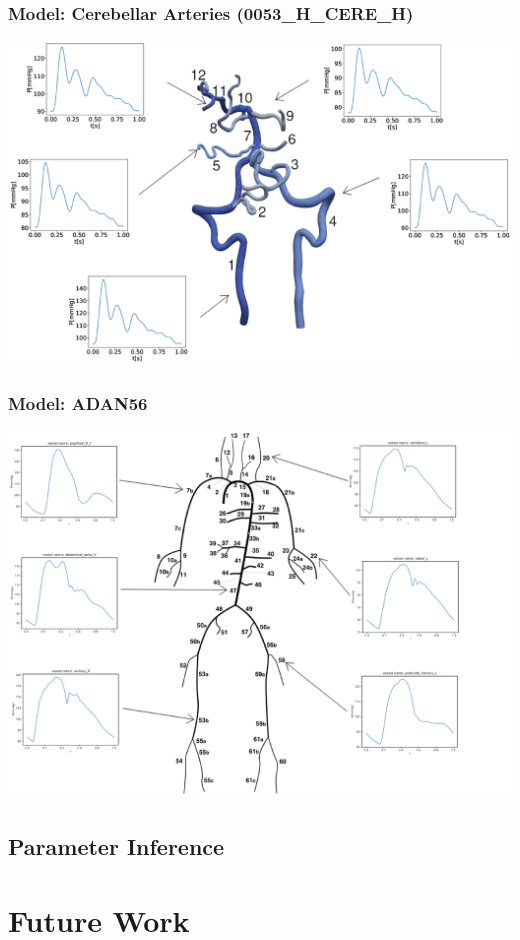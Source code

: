 \documentclass[compress]{beamer}
\begin{document}
\begin{frame}
	\frametitle{Model: Cerebellar Arteries (0053\_H\_CERE\_H)}
	\includegraphics[width=\columnwidth]{images/0053.eps}
\end{frame}
\begin{frame}
	\frametitle{Model: ADAN56}
	\includegraphics[width=\textwidth]{images/adan56.eps}
\end{frame}

\subsection{Parameter Inference}

\section{Future Work}
\end{document}
